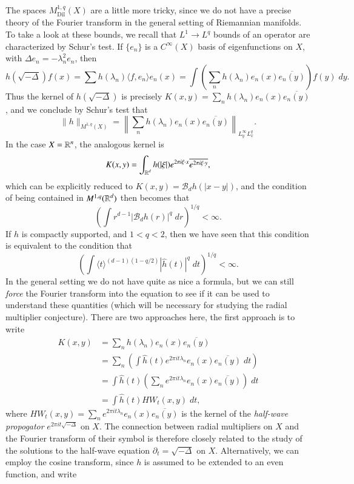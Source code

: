 The spaces $M^{1,q}_{\text{Dil}}(X)$ are a little more tricky, since we do not have a precise theory of the Fourier transform in the general setting of Riemannian manifolds. To take a look at these bounds, we recall that $L^1 \to L^q$ bounds of an operator are characterized by Schur's test. If $\{ e_n \}$ is a $C^\infty(X)$ basis of eigenfunctions on $X$, with $\Delta e_n = - \lambda_n^2 e_n$, then
%
\[ h(\sqrt{-\Delta}) f(x) = \sum h(\lambda_n) \langle f, e_n \rangle e_n(x) = \int \left( \sum_n h(\lambda_n) e_n(x) \overline{e_n(y)} \right) f(y)\; dy. \]
%
Thus the kernel of $h(\sqrt{-\Delta})$ is precisely $K(x,y) = \sum_n h(\lambda_n) e_n(x) \overline{e_n(y)}$, and we conclude by Schur's test that
%
\[ \| h \|_{M^{1,q}(X)} = \left\| \sum_n h(\lambda_n) e_n(x) \overline{e_n(y)} \right\|_{L^\infty_y L^q_x}. \]
%
In the case $X = \operatorname{\mathbb{R}}^n$, the analogous kernel is
%
\[ K(x,y) = \int_{\operatorname{\mathbb{R}}^d} h(|\xi|) e^{2 \pi i \xi \cdot x} \overline{e^{2 \pi i \xi \cdot y}}, \]
%
which can be explicitly reduced to $K(x,y) = \mathcal{B}_d h(|x - y|)$, and the condition of being contained in $M^{1,q}(\operatorname{\mathbb{R}}^d)$ then becomes that
%
\[ \left( \int r^{d-1} |\mathcal{B}_d h(r)|^q\; dr \right)^{1/q} < \infty. \]
%
If $h$ is compactly supported, and $1 < q < 2$, then we have seen that this condition is equivalent to the condition that
%
\[ \left( \int \langle t \rangle^{(d-1)(1 - q/2)} |\widehat{h}(t)|^q\; dt \right)^{1/q} < \infty. \]
%
In the general setting we do not have quite as nice a formula, but we can still \emph{force} the Fourier transform into the equation to see if it can be used to understand these quantities (which will be necessary for studying the radial multiplier conjecture). There are two approaches here, the first approach is to write
%
\begin{align*}
    K(x,y) &= \sum_n h(\lambda_n) e_n(x) \overline{e_n(y)}\\
    &= \sum_n \left( \int \widehat{h}(t) e^{2 \pi i t \lambda_n} e_n(x) \overline{e_n(y)}\; dt \right) \\
    &= \int \widehat{h}(t) \left( \sum_n e^{2 \pi i t \lambda_n} e_n(x) \overline{e_n(y)} \right)\; dt\\
    &= \int \widehat{h}(t) HW_t(x,y)\; dt,
\end{align*}
%
where $HW_t(x,y) = \sum_n e^{2 \pi i t \lambda_n} e_n(x) \overline{e_n(y)}$ is the kernel of the \emph{half-wave propogator} $e^{2 \pi i t \sqrt{-\Delta}}$ on $X$. The connection between radial multipliers on $X$ and the Fourier transform of their symbol is therefore closely related to the study of the solutions to the half-wave equation $\partial_t = \sqrt{-\Delta}$ on $X$. Alternatively, we can employ the cosine transform, since $h$ is assumed to be extended to an even function, and write
